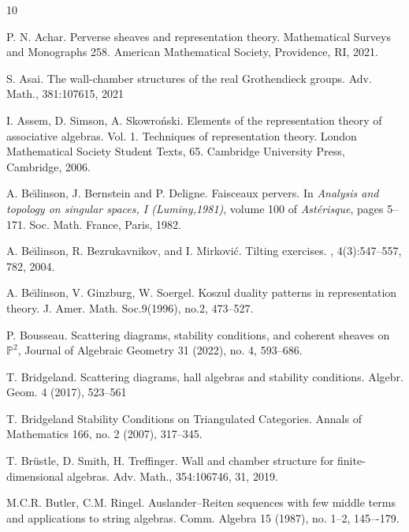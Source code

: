 \documentclass[11pt]{amsart}
\theoremstyle{definition}
\begin{document}
\begin{thebibliography}{10}

        P. N. Achar.
        \newblock Perverse sheaves and representation theory.
        \newblock Mathematical Surveys and Monographs 258.
        \newblock American Mathematical Society, Providence, RI, 2021.

S. Asai. 
\newblock The wall-chamber structures of the real Grothendieck groups. 
\newblock Adv. Math.,
381:107615, 2021

I. Assem, D. Simson, A. Skowroński.
\newblock Elements of the representation theory of associative algebras. Vol. 1. Techniques of representation theory. London Mathematical Society Student Texts, 65. Cambridge University Press, Cambridge, 2006. 

A. Be\u{\i}linson, J. Bernstein and P. Deligne.
\newblock Faisceaux pervers.
\newblock In {\em Analysis and topology on singular spaces, {I} ({L}uminy,1981)}, volume 100 of {\em Ast\'erisque}, pages 5--171. Soc. Math. France,
 Paris, 1982.

A. Be\u{\i}linson, R. Bezrukavnikov, and I. Mirkovi\'{c}.
\newblock Tilting exercises.
, 4(3):547--557, 782, 2004.

A. Be\u{\i}linson, V. Ginzburg, W. Soergel.
\newblock Koszul duality patterns in representation theory.
\newblock J. Amer. Math. Soc.9(1996), no.2, 473--527.

P. Bousseau.
\newblock Scattering diagrams, stability conditions, and coherent sheaves on $\mathbb{P}^2$,
\newblock 
Journal of Algebraic Geometry 31 (2022), no. 4, 593--686.

T. Bridgeland. 
\newblock Scattering diagrams, hall algebras and stability conditions. \newblock Algebr. Geom. 4 (2017), 523--561

T. Bridgeland
\newblock Stability Conditions on Triangulated Categories.
\newblock Annals of Mathematics 166, no. 2 (2007), 317--345. 

T. Br\"ustle, D. Smith,  H. Treffinger. 
\newblock Wall and chamber structure for finite-
dimensional algebras. 
\newblock Adv. Math., 354:106746, 31, 2019.

M.C.R. Butler, C.M. Ringel.
\newblock Auslander--Reiten sequences with few middle terms and applications to string algebras.
\newblock Comm. Algebra 15 (1987), no. 1--2, 145–-179. 


\end{thebibliography}
\end{document}
